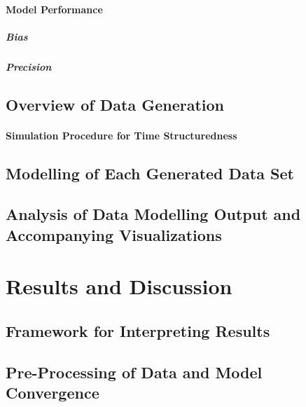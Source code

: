 \documentclass[
12pt, %
twoside,
english]{guelphthesis}
\begin{document}
\hypertarget{model-performance-2}{%
\paragraph{Model Performance}\label{model-performance-2}}

\hypertarget{bias-1}{%
\subparagraph{Bias}\label{bias-1}}

\hypertarget{precision-1}{%
\subparagraph{Precision}\label{precision-1}}

\hypertarget{overview-of-data-generation-1}{%
\subsection{Overview of Data Generation}\label{overview-of-data-generation-1}}

\hypertarget{simulating-time-struc}{%
\paragraph{Simulation Procedure for Time Structuredness}\label{simulating-time-struc}}

\hypertarget{data-modelling-exp3}{%
\subsection{Modelling of Each Generated Data Set}\label{data-modelling-exp3}}

\hypertarget{analysis-of-data-modelling-output-and-accompanying-visualizations-1}{%
\subsection{Analysis of Data Modelling Output and Accompanying Visualizations}\label{analysis-of-data-modelling-output-and-accompanying-visualizations-1}}

\hypertarget{results-and-discussion-2}{%
\section{Results and Discussion}\label{results-and-discussion-2}}

\hypertarget{framework-for-interpreting-results-2}{%
\subsection{Framework for Interpreting Results}\label{framework-for-interpreting-results-2}}

\hypertarget{pre-processing-of-data-and-model-convergence-2}{%
\subsection{Pre-Processing of Data and Model Convergence}\label{pre-processing-of-data-and-model-convergence-2}}
\end{document}
